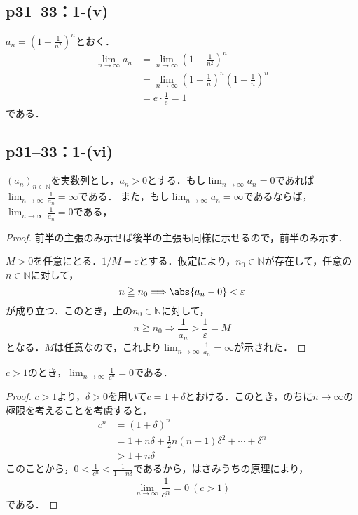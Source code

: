 \subsection*{p31--33：1-(v)}
\begin{tleftbar}
    $a_n =\left (1-\frac{1}{n^2}\right)^n$とおく．
    \begin{align*}
        \lim_{n \to \infty} a_n & =\lim_{n \to \infty} \left (1-\frac{1}{n^2}\right)^n                              \\
                                & = \lim_{n \to \infty} \left (1+\frac{1}{n}\right)^n \left (1-\frac{1}{n}\right)^n \\
                                & = e \cdot \frac{1}{e} =1
    \end{align*}
    である．
\end{tleftbar}

\subsection*{p31--33：1-(vi)}


$(a_n)_{n \in \mathbb{N}}$を実数列とし，$a_n > 0$とする．もし$\lim_{n \to \infty} a_n =0$であれば$\lim_{n \to \infty} \frac{1}{a_n}=\infty$である．
また，もし$\lim_{n \to \infty} a_n =\infty$であるならば，$\lim_{n \to \infty} \frac{1}{a_n} =0$である，



\begin{proof}
    前半の主張のみ示せば後半の主張も同様に示せるので，前半のみ示す．

    $M>0$を任意にとる．$1/M = \varepsilon$とする．仮定により，$n_0 \in \mathbb{N}$が存在して，任意の$n \in \mathbb{N}$に対して，
    \[
        n \geqq n_0 \Longrightarrow \abs{a_n-0}<\varepsilon
    \]
    が成り立つ．このとき，上の$n_0 \in \mathbb{N}$に対して，
    \[
        n \geqq n_0 \Longrightarrow \frac{1}{a_n} >\frac{1}{\varepsilon}=M
    \]
    となる．$M$は任意なので，これより$\lim_{n \to \infty} \frac{1}{a_n}=\infty$が示された．
\end{proof}



$c>1$のとき，$\lim_{n \to \infty} \frac{1}{c^n} = 0$である．

\begin{proof}
    $c>1$より，$\delta >0$を用いて$c=1+\delta$とおける．このとき，のちに$n \to \infty$の極限を考えることを考慮すると，
    \begin{align*}
        c^n & = (1+\delta)^n                                               \\
            & = 1+n \delta +\frac{1}{2}n (n-1) \delta^2 + \cdots +\delta^n \\
            & > 1+n \delta
    \end{align*}
    このことから，$0<\frac{1}{c^n} <\frac{1}{1+n\delta}$であるから，はさみうちの原理により，
    \[
        \lim_{n \to \infty} \frac{1}{c^n} = 0~(c>1)
    \]
    である．
\end{proof}

